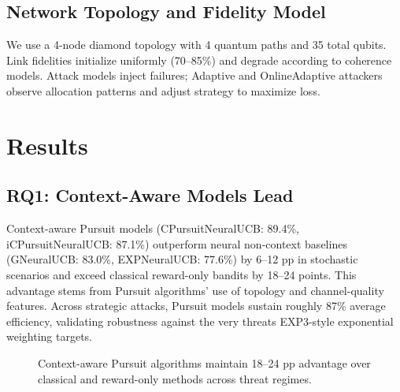 \documentclass[sigconf,anonymous]{acmart}
\begin{document}
\subsection{Network Topology and Fidelity Model}

We use a 4-node diamond topology with 4 quantum paths and 35 total qubits. Link fidelities initialize uniformly (70--85\%) and degrade according to coherence models. Attack models inject failures; Adaptive and OnlineAdaptive attackers observe allocation patterns and adjust strategy to maximize loss.

\section{Results}
\label{sec:results}

\subsection{RQ1: Context-Aware Models Lead}

Context-aware Pursuit models (CPursuitNeuralUCB: 89.4\%, iCPursuitNeuralUCB: 87.1\%) outperform neural non-context baselines (GNeuralUCB: 83.0\%, EXPNeuralUCB: 77.6\%) by 6--12 pp in stochastic scenarios and exceed classical reward-only bandits by 18--24 points. This advantage stems from Pursuit algorithms' use of topology and channel-quality features. Across strategic attacks, Pursuit models sustain roughly 87\% average efficiency, validating robustness against the very threats EXP3-style exponential weighting targets.

\begin{figure}[tb]
\centering
{}
\caption{Context-aware Pursuit algorithms maintain 18--24 pp advantage over classical and reward-only methods across threat regimes.}
\label{fig:context}
\end{figure}
\end{document}
